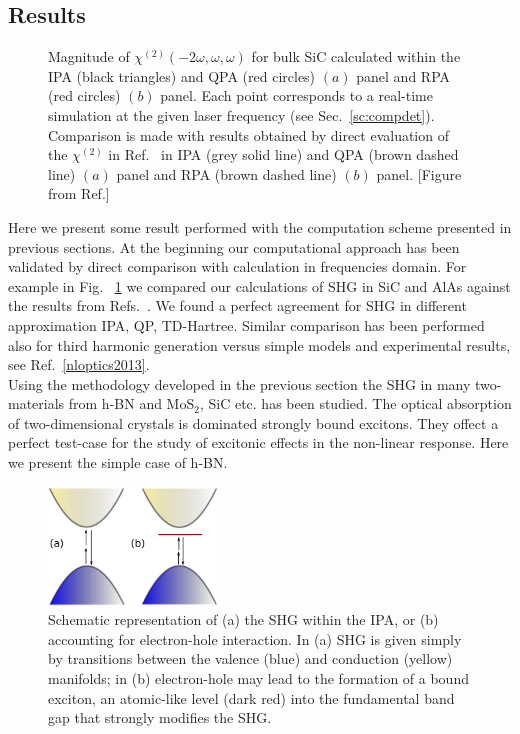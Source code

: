 \subsection{Results}\label{sc:results}
\begin{figure}[ht]
\centering
{}
\caption{\footnotesize{Magnitude of $\chi^{(2)}(-2\omega,\omega,\omega)$ for bulk SiC calculated within the IPA (black triangles) and QPA (red circles) $(a)$ panel and RPA (red circles) $(b)$ panel. Each point corresponds to a real-time simulation at the given laser frequency (see Sec.~\ref{sc:compdet}). Comparison is made with results obtained \ai by direct evaluation of the $\chi^{(2)}$ in Ref.~\cite{PhysRevB.82.235201} in IPA (grey solid line) and QPA (brown dashed line) $(a)$  panel and RPA (brown dashed line) $(b)$ panel.  \label{fg:SiCQPRPA} [Figure from Ref.\cite{nloptics2013}]}}
\end{figure}
%                                                                                                                     
Here we present some result performed with the computation scheme presented in previous sections.
At the beginning our computational approach has been validated by direct comparison with calculation in frequencies domain. For example in Fig. ~\ref{fg:SiCQPRPA} we compared our calculations of SHG in SiC and AlAs against the results from Refs.~\cite{PhysRevB.82.235201,PSSB.427.1984}. We found a perfect agreement for SHG in different approximation IPA, QP, TD-Hartree.  Similar comparison has been performed also for third harmonic generation versus simple models and experimental results, see Ref.~\ref{nloptics2013}.\\
Using the methodology developed in the previous section the SHG in many two-materials from h-BN and MoS$_2$, SiC etc. has been studied.\cite{attaccalite2015strong,wei2019second,beach2020strain,mishra2020exciton,attaccalite2019second} The optical absorption of two-dimensional crystals is dominated strongly bound excitons. They offect a perfect test-case for the study of excitonic effects in the non-linear response.
Here we present the simple case of h-BN.
\begin{figure}
\begin{center}
\includegraphics[width=0.4\textwidth]{Figures/exciton}
\caption{\footnotesize{Schematic representation of  (a) the SHG within the IPA, or (b) accounting for electron-hole interaction. In (a) SHG is given simply by transitions between the valence (blue) and conduction (yellow) manifolds; in (b) electron-hole may lead to the formation of a bound exciton, an atomic-like level (dark red) into the fundamental band gap that strongly modifies the SHG. \label{schemeshg}}}  
\end{center}
\end{figure}   

